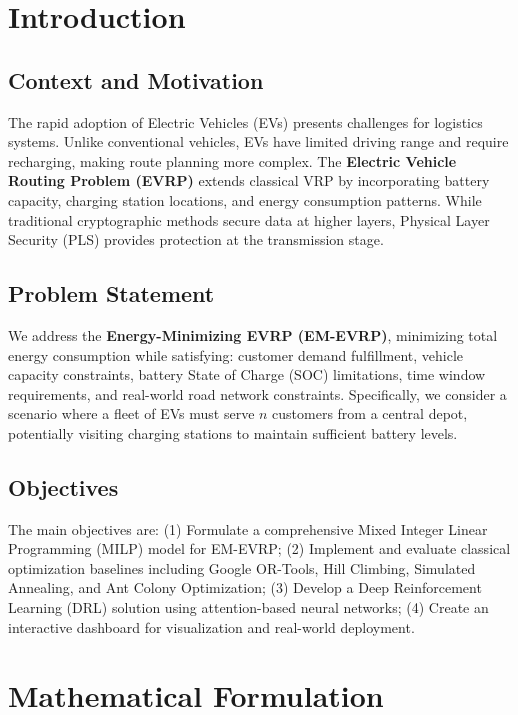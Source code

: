 \documentclass[10pt,a4paper]{article}
\begin{document}
\section{Introduction}
\subsection{Context and Motivation}
The rapid adoption of Electric Vehicles (EVs) presents challenges for logistics systems. Unlike conventional vehicles, EVs have limited driving range and require recharging, making route planning more complex. The \textbf{Electric Vehicle Routing Problem (EVRP)} extends classical VRP by incorporating battery capacity, charging station locations, and energy consumption patterns. While traditional cryptographic methods secure data at higher layers, Physical Layer Security (PLS) provides protection at the transmission stage.
\subsection{Problem Statement}
We address the \textbf{Energy-Minimizing EVRP (EM-EVRP)}, minimizing total energy consumption while satisfying: customer demand fulfillment, vehicle capacity constraints, battery State of Charge (SOC) limitations, time window requirements, and real-world road network constraints. Specifically, we consider a scenario where a fleet of EVs must serve $n$ customers from a central depot, potentially visiting charging stations to maintain sufficient battery levels.
\subsection{Objectives}
The main objectives are: (1) Formulate a comprehensive Mixed Integer Linear Programming (MILP) model for EM-EVRP; (2) Implement and evaluate classical optimization baselines including Google OR-Tools, Hill Climbing, Simulated Annealing, and Ant Colony Optimization; (3) Develop a Deep Reinforcement Learning (DRL) solution using attention-based neural networks; (4) Create an interactive dashboard for visualization and real-world deployment.

\section{Mathematical Formulation}
\end{document}
